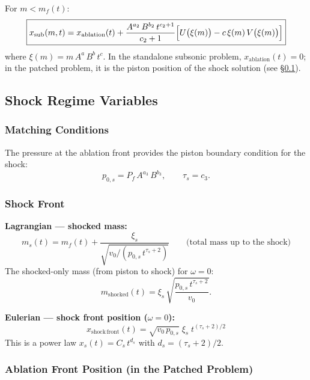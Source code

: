 \documentclass[11pt]{article}
\newcommand{\xsi}{\xi}
\newcommand{\xsis}{\xi_s}
\begin{document}
For $m < m_f(t)$:
\begin{equation}
  \boxed{x_{\mathrm{sub}}(m,t) = x_{\mathrm{ablation}}(t) +
  \frac{A^{a_2}\,B^{b_2}\,t^{c_2+1}}{c_2+1}
  \Bigl[U\bigl(\xsi(m)\bigr) - c\,\xsi(m)\,V\bigl(\xsi(m)\bigr)\Bigr]}
  \label{eq:x_sub}
\end{equation}
where $\xsi(m) = m\,A^{a}\,B^{b}\,t^{c}$. In the standalone subsonic problem, $x_{\mathrm{ablation}}(t) = 0$; in the patched problem, it is the piston position of the shock solution (see \S\ref{sec:shock_variables}).

\subsection{Shock Regime Variables}
\label{sec:shock_variables}

\subsubsection{Matching Conditions}

The pressure at the ablation front provides the piston boundary condition for the shock:
\begin{equation}
  \boxed{p_{0,s} = P_f\,A^{a_3}\,B^{b_3}, \qquad \tau_s = c_3.}
\end{equation}

\subsubsection{Shock Front}

\textbf{Lagrangian --- shocked mass:}
\begin{equation}
  \boxed{m_s(t) = m_f(t) + \frac{\xsis}{\sqrt{v_0/(p_{0,s}\,t^{\tau_s+2})}}}
  \qquad\text{(total mass up to the shock)}
\end{equation}
The shocked-only mass (from piston to shock) for $\omega=0$:
\begin{equation}
  m_{\mathrm{shocked}}(t) = \xsis\,\sqrt{\frac{p_{0,s}\,t^{\tau_s+2}}{v_0}}.
\end{equation}

\textbf{Eulerian --- shock front position ($\omega = 0$):}
\begin{equation}
  \boxed{x_{\mathrm{shock\,front}}(t) = \sqrt{v_0\,p_{0,s}}\;\xsis\;t^{(\tau_s+2)/2}}
\end{equation}
This is a power law $x_s(t) = C_s\,t^{d_s}$ with $d_s = (\tau_s + 2)/2$.

\subsubsection{Ablation Front Position (in the Patched Problem)}
\end{document}
